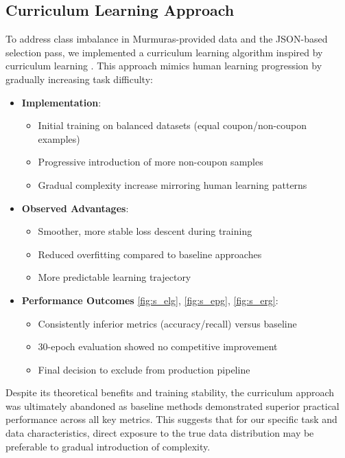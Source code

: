 \documentclass[licencjacka,en]{pracamgr}
\let\cleardoublepage\clearpage
\begin{document}
\let\cleardoublepage\clearpage
\begin{appendices}
\chapter{Curriculum Learning Approach} \label{AppA}

To address class imbalance in Murmuras-provided data and the JSON-based selection pass, we implemented a curriculum learning algorithm inspired by curriculum learning \cite{CurrLearn}. This approach mimics human learning progression by gradually increasing task difficulty:

\begin{itemize}
    \item \textbf{Implementation}:
    \begin{itemize}
        \item Initial training on balanced datasets (equal coupon/non-coupon examples)
        \item Progressive introduction of more non-coupon samples
        \item Gradual complexity increase mirroring human learning patterns
    \end{itemize}
    
    \item \textbf{Observed Advantages}:
    \begin{itemize}
        \item Smoother, more stable loss descent during training
        \item Reduced overfitting compared to baseline approaches
        \item More predictable learning trajectory
    \end{itemize}
    
    \item \textbf{Performance Outcomes} \ref{fig:s_elg}, \ref{fig:s_epg}, \ref{fig:s_erg}:
    \begin{itemize}
        \item Consistently inferior metrics (accuracy/recall) versus baseline
        \item 30-epoch evaluation showed no competitive improvement
        \item Final decision to exclude from production pipeline
    \end{itemize}
\end{itemize}

Despite its theoretical benefits and training stability, the curriculum approach was ultimately abandoned as baseline methods demonstrated superior practical performance across all key metrics. This suggests that for our specific task and data characteristics, direct exposure to the true data distribution may be preferable to gradual introduction of complexity.


\end{appendices}
\end{document}
